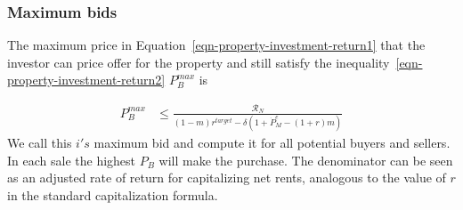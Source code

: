 % 
% 
% 

\subsubsection{Maximum bids}
The maximum price in Equation~\ref{eqn-property-investment-return1} that the investor can price offer for the property  and still satisfy the inequality~\ref{eqn-property-investment-return2} $P_B^{max}$ is

\begin{eqnarray}
P_B^{max} & \le    \frac{\mathcal{R}_N}{(1-m)r^{target}-\delta \left(1 + \dot P_M^e - (1+r)m\right)} \label{eqn-bid-price} \end{eqnarray}
We call this  $i's$ maximum bid and compute it for all potential buyers and sellers. In each sale the highest $P_B$ will make the purchase. The denominator can be seen as an adjusted rate of return for capitalizing net rents, analogous to the value of $r$ in  the standard capitalization formula.

